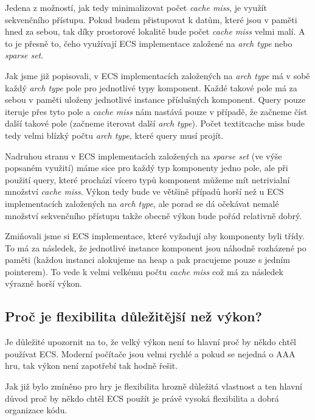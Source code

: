 Jedena z možností, jak tedy minimalizovat počet \textit{cache miss}, je využít sekvenčního přístupu. Pokud budem přistupovat k datům, které jsou v paměti hned za sebou, tak díky prostorové lokalitě bude počet \textit{cache miss} velmi malí. A to je přesně to, čeho využívají ECS implementace založené na \textit{arch type} nebo \textit{sparse set}.

Jak jsme již popisovali, v ECS implementacích založených na \textit{arch type} má v sobě každý \textit{arch type} pole pro jednotlivé typy komponent. Každé takové pole má za sebou v paměti uloženy jednotlivé instance příslušných komponent. Query pouze iteruje přes tyto pole a \textit{cache miss} nám nastává pouze v případě, že začneme číst další takové pole (začneme iterovat další \textit{arch type}). Počet textit{cache miss} bude tedy velmi blízký počtu \textit{arch type}, které query musí projít.

Nadruhou stranu v ECS implementacích založených na \textit{sparse set} (ve výše popsaném využití) máme sice pro každý typ komponenty jedno pole, ale při použití query, které prochází vícero typů komponent můžeme mít netrivialní množství \textit{cache miss}. Výkon tedy bude ve většině případů horší než u ECS implementacích založených na \textit{arch type}, ale porad se dá očekávat nemalé množství sekvenčního přístupu takže obecně výkon bude pořád relativně dobrý.

Zmiňovali jsme si ECS implementace, které vyžadují aby komponenty byli třídy. To má za následek, že jednotlivé instance komponent jsou náhodně rozházené po paměti (každou instanci alokujeme na heap a pak pracujeme pouze s jedním pointerem). To vede k velmi velkému počtu \textit{cache miss} což má za následek výrazně horší výkon.

\subsection{Proč je flexibilita důležitější než výkon?}

Je důležité upozornit na to, že velký výkon není to hlavní proč by někdo chtěl používat ECS. Moderní počítače jsou velmi rychlé a pokud se nejedná o AAA hru, tak výkon není zapotřebí tak hodně řešit. 

Jak již bylo zmíněno pro hry je flexibilita hrozně důležitá vlastnost a ten hlavní důvod proč by někdo chtěl ECS použít je právě vysoká flexibilita a dobrá organizace kódu.


